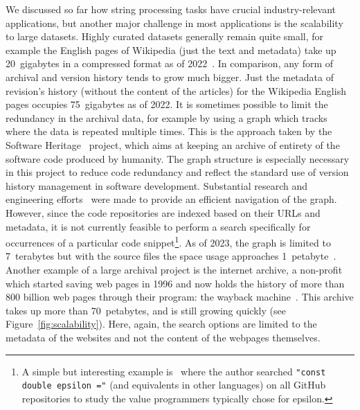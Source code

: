 We discussed so far how string processing tasks have crucial industry-relevant applications, but another major challenge in most applications is the scalability to large datasets.
Highly curated datasets generally remain quite small, for example the English pages of Wikipedia (just the text and metadata) take up 20~gigabytes in a compressed format as of 2022~\cite{wikimedia}. In comparison, any form of archival and version history tends to grow much bigger. Just the metadata of revision's history (without the content of the articles) for the Wikipedia English pages occupies 75~gigabytes as of 2022.
It is sometimes possible to limit the redundancy in the archival data, for example by using a graph which tracks where the data is repeated multiple times. This is the approach taken by the Software Heritage~\cite{swh-site} project, which aims at keeping an archive of entirety of the software code produced by humanity. The graph structure is especially necessary in this project to reduce code redundancy and reflect the standard use of version history management in software development.
Substantial research and engineering efforts~\cite{DBLP:phd/hal/Pietri21} were made to provide an efficient navigation of the graph. 
However, since the code repositories are indexed based on their URLs and metadata, it is not currently feasible to perform a search specifically for occurrences of a particular code snippet\footnote{\setlength\parindent{10pt} A simple but interesting example is~\cite{vii2014if} where the author searched \texttt{"const double epsilon ="} (and equivalents in other languages) on all GitHub repositories to study the value programmers typically chose for epsilon.}.
As of 2023, the graph is limited to 7~terabytes but with the source files the space usage approaches 1~petabyte~\cite{swh-polytechnique}.
Another example of a large archival project is the internet archive, a non-profit which started saving web pages in 1996 and now holds the history of more than 800 billion web pages through their program: the wayback machine~\cite{web-archive}. This archive takes up more than 70~petabytes, and is still growing quickly (see Figure~\ref{fig:scalability}).
Here, again, the search options are limited to the metadata of the websites and not the content of the webpages themselves.


